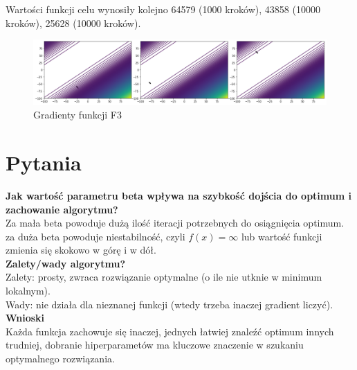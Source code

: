\documentclass{article}
\begin{document}
\noindent Wartości funkcji celu wynosiły kolejno 64579 (1000 kroków), 43858 (10000 kroków), 25628 (10000 kroków).

\begin{figure}[!h]
    \centering \includegraphics[width=\linewidth]{f3.pdf}
    \caption{Gradienty funkcji F3}
\end{figure}

\section*{Pytania}
\noindent\textbf{Jak wartość parametru beta wpływa na szybkość dojścia do optimum i zachowanie algorytmu?}\\
Za mała beta powoduje dużą ilość iteracji potrzebnych do osiągnięcia optimum. za duża beta powoduje niestabilność, czyli $f(x) = \infty$ lub wartość funkcji zmienia się skokowo w górę i w dół.\\

\noindent\textbf{Zalety/wady algorytmu?}\\
Zalety: prosty, zwraca rozwiązanie optymalne (o ile nie utknie w minimum lokalnym).\\
Wady: nie działa dla nieznanej funkcji (wtedy trzeba inaczej gradient liczyć).\\

\noindent\textbf{Wnioski}\\
Każda funkcja zachowuje się inaczej, jednych łatwiej znaleźć optimum innych trudniej, dobranie hiperparametów ma kluczowe znaczenie w szukaniu optymalnego rozwiązania.
\end{document}
